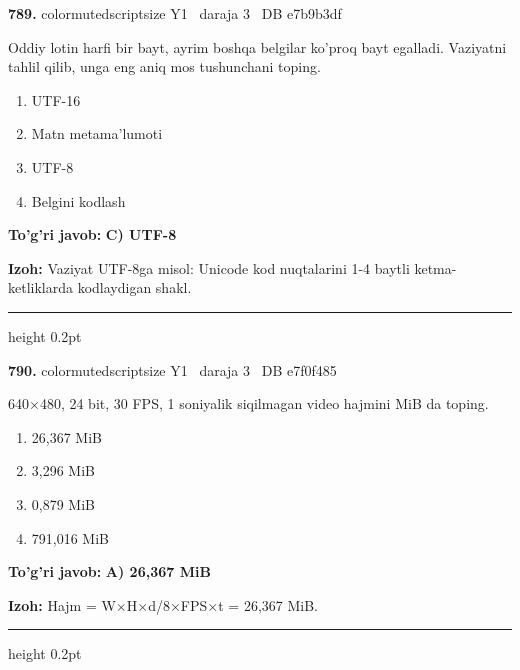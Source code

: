\documentclass[10pt,a4paper,oneside]{article}
\begin{document}
\noindent\textbf{\color{ink}789.}  {color{muted}scriptsize Y1 \textbullet\ daraja 3 \textbullet\ DB e7b9b3df}
\par
Oddiy lotin harfi bir bayt, ayrim boshqa belgilar ko'proq bayt egalladi. Vaziyatni tahlil qilib, unga eng aniq mos tushunchani toping.
\begin{enumerate}[label=\Alph*),leftmargin=9mm]
\item UTF-16
\item Matn metama'lumoti
\item UTF-8
\item Belgini kodlash
\end{enumerate}
\begin{tcolorbox}[enhanced,breakable,colback=teal!4,colframe=teal!50!black,boxrule=0.5pt,arc=1.1mm,left=3mm,right=3mm,top=1.7mm,bottom=1.7mm,before skip=2mm,after skip=2mm]
\textbf{\color{teal}To'g'ri javob:} \textbf{C) UTF-8}
\par\smallskip
\textbf{Izoh:} Vaziyat UTF-8ga misol: Unicode kod nuqtalarini 1-4 baytli ketma-ketliklarda kodlaydigan shakl.
\end{tcolorbox}
\vspace{2mm}\hrule height 0.2pt \vspace{3mm}

\noindent\textbf{\color{ink}790.}  {color{muted}scriptsize Y1 \textbullet\ daraja 3 \textbullet\ DB e7f0f485}
\par
640\ensuremath{\times}480, 24 bit, 30 FPS, 1 soniyalik siqilmagan video hajmini MiB da toping.
\begin{enumerate}[label=\Alph*),leftmargin=9mm]
\item 26,367 MiB
\item 3,296 MiB
\item 0,879 MiB
\item 791,016 MiB
\end{enumerate}
\begin{tcolorbox}[enhanced,breakable,colback=teal!4,colframe=teal!50!black,boxrule=0.5pt,arc=1.1mm,left=3mm,right=3mm,top=1.7mm,bottom=1.7mm,before skip=2mm,after skip=2mm]
\textbf{\color{teal}To'g'ri javob:} \textbf{A) 26,367 MiB}
\par\smallskip
\textbf{Izoh:} Hajm = W\ensuremath{\times}H\ensuremath{\times}d/8\ensuremath{\times}FPS\ensuremath{\times}t = 26,367 MiB.
\end{tcolorbox}
\vspace{2mm}\hrule height 0.2pt \vspace{3mm}
\end{document}
